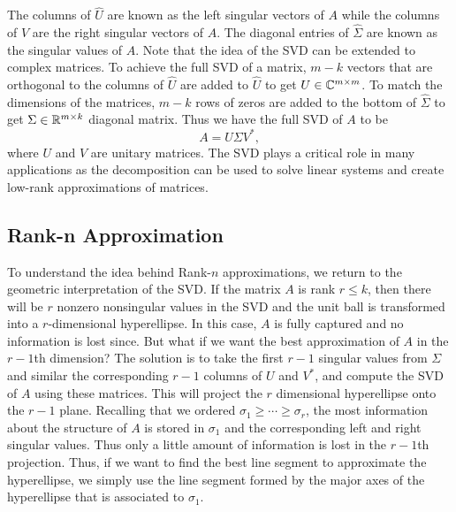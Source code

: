 \documentclass[12pt]{article}%
\begin{document}
The columns of $\hat{U}$ are known as the left singular vectors of $A$ while the columns of $V$ are the right singular vectors of $A$. The diagonal entries of $\hat{\Sigma}$ are known as the singular values of $A$. Note that the idea of the SVD can be extended to complex matrices. To achieve the full SVD of a matrix, $m-k$ vectors that are orthogonal to the columns of $\hat{U}$ are added to $\hat{U}$ to get $U \in {\mathbb C}^{m \times m}$. To match the dimensions of the matrices, $m-k$ rows of zeros are added to the bottom of $\hat{\Sigma}$ to get $\Sigma \in {\mathbb R}^{m \times k}$ diagonal matrix. Thus we have the full SVD of $A$ to be
\begin{equation}\label{full svd}
    A = U \Sigma V^*,
\end{equation}  
where $U$ and $V$ are unitary matrices. The SVD plays a critical role in many applications as the decomposition can be used to solve linear systems and create low-rank approximations of matrices.   


\subsection{Rank-n Approximation}

To understand the idea behind Rank-$n$ approximations, we return to the geometric interpretation of the SVD. If the matrix $A$ is rank $r \leq k$, then there will be $r$ nonzero nonsingular values in the SVD and the unit ball is transformed into a $r$-dimensional hyperellipse. In this case, $A$ is fully captured and no information is lost since. But what if we want the best approximation of $A$ in the $r-1$th dimension? The solution is to take the first $r-1$ singular values from $\Sigma$ and similar the corresponding $r-1$ columns of $U$ and $V^*$, and compute the SVD of $A$ using these matrices. This will project the $r$ dimensional hyperellipse onto the $r-1$ plane. Recalling that we ordered $\sigma_1 \geq \cdots \geq \sigma_r$, the most information about the structure of $A$ is stored in $\sigma_1$ and the corresponding left and right singular values. Thus only a little amount of information is lost in the $r-1$th projection. Thus, if we want to find the best line segment to approximate the hyperellipse, we simply use the line segment formed by the major axes of the hyperellipse that is associated to $\sigma_1$.    
\end{document}
